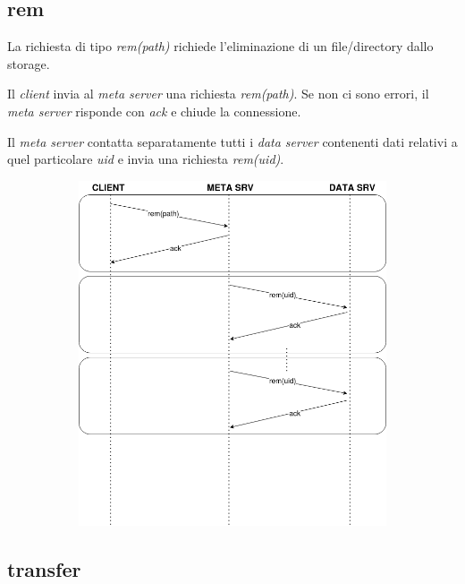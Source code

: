 \documentclass{article}
\begin{document}
\subsection{rem}

La richiesta di tipo \textit{rem(path)} richiede l'eliminazione di un file/directory dallo storage.

Il \textit{client} invia al \textit{meta server} una richiesta \textit{rem(path)}. Se non ci sono errori, il \textit{meta server} risponde con \textit{ack} e chiude la connessione.

Il \textit{meta server} contatta separatamente tutti i \textit{data server} contenenti dati relativi a quel particolare \textit{uid} e invia una richiesta \textit{rem(uid)}.  

\begin{figure}[H]
	\centering
	\begin{subfigure}{0.80\linewidth}
		\includegraphics[width=\linewidth]{../diagrams/requests/rem_request.png}
	\end{subfigure}
\end{figure}



\subsection{transfer}
\end{document}
